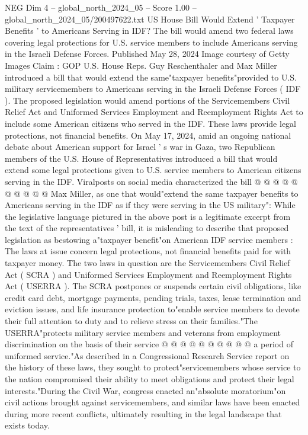 \begin{textsample}{NEG Dim 4 – global\_north\_2024\_05 – Score 1.00 – global\_north\_2024\_05/200497622.txt}  \label{ex:f4_neg_113}
US House Bill Would Extend ' Taxpayer Benefits ' to Americans Serving in IDF?
The bill would amend two federal laws covering legal protections for U.S. service members to include Americans serving in the Israeli Defense Forces.
Published May 28, 2024 Image courtesy of Getty Images Claim : GOP U.S.
House Reps.
Guy Reschenthaler and Max Miller introduced a bill that would extend the same"taxpayer benefits"provided to U.S. military servicemembers to Americans serving in the Israeli Defense Forces ( IDF ).
The proposed legislation would amend portions of the Servicemembers Civil Relief Act and Uniformed Services Employment and Reemployment Rights Act to include some American citizens who served in the IDF.
These laws provide legal protections, not financial benefits.
On May 17, 2024, amid an ongoing national debate about American support for Israel ' s war in Gaza, two Republican members of the U.S.
House of Representatives introduced a bill that would extend some legal protections given to U.S. service members to American citizens serving in the IDF.
Viralposts on social media characterized the bill @ @ @ @ @ @ @ @ @ @ Max Miller, as one that would"extend the same taxpayer benefits to Americans serving in the IDF as if they were serving in the US military": While the legislative language pictured in the above post is a legitimate excerpt from the text of the representatives ' bill, it is misleading to describe that proposed legislation as bestowing a"taxpayer benefit"on American IDF service members : The laws at issue concern legal protections, not financial benefits paid for with taxpayer money.
The two laws in question are the Servicemembers Civil Relief Act ( SCRA ) and Uniformed Services Employment and Reemployment Rights Act ( USERRA ).
The SCRA postpones or suspends certain civil obligations, like credit card debt, mortgage payments, pending trials, taxes, lease termination and eviction issues, and life insurance protection to"enable service members to devote their full attention to duty and to relieve stress on their families."The USERRA"protects military service members and veterans from employment discrimination on the basis of their service @ @ @ @ @ @ @ @ @ @ a period of uniformed service."As described in a Congressional Research Service report on the history of these laws, they sought to protect"servicemembers whose service to the nation compromised their ability to meet obligations and protect their legal interests."During the Civil War, congress enacted an"absolute moratorium"on civil actions brought against servicemembers, and similar laws have been enacted during more recent conflicts, ultimately resulting in the legal landscape that exists today.

\end{textsample}

